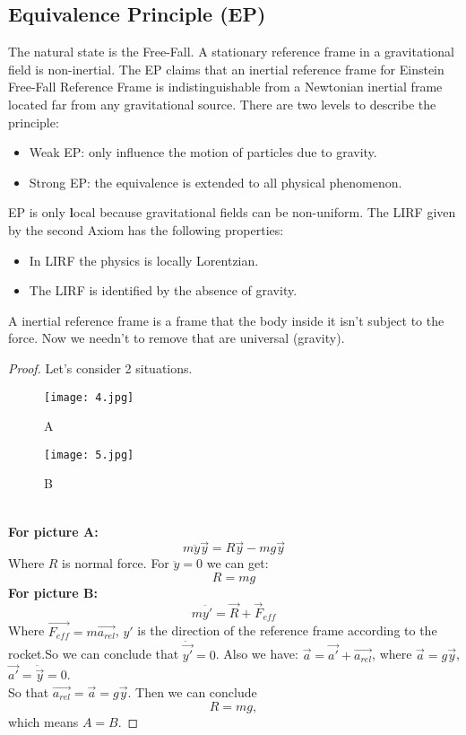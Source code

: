 \documentclass[openany,10pt]{book}
\theoremstyle{definition}
\theoremstyle{definition}
\theoremstyle{remark}
\begin{document}
\subsection{Equivalence Principle (EP)}
The natural state is the Free-Fall. A stationary reference frame in a gravitational field is non-inertial.
The EP claims that an inertial reference frame for Einstein Free-Fall Reference Frame is indistinguishable from a Newtonian inertial frame located far from any gravitational source. There are two levels to describe the principle:
\begin{itemize}
\item Weak EP: only influence the motion of particles due to gravity.
\item Strong EP: the equivalence is extended to all physical phenomenon.
\end{itemize}
EP is only {\textbf local} because gravitational fields can be non-uniform.
The LIRF given by the second Axiom has the following properties:
\begin{itemize}
\item In LIRF the physics is locally Lorentzian.
\item The LIRF is identified by the absence of gravity.
\end{itemize}
A inertial reference frame is a frame that the body inside it isn't subject to the force. Now we needn't to remove that are universal (gravity).\\

\begin{proof}

Let's consider 2 situations.
\begin{figure}[htbp]
\begin{minipage}[t]{0.5\linewidth}
\centering
\texttt{[image: 4.jpg]}
\caption{A}
\label{fig:side:a}
\end{minipage}%
\begin{minipage}[t]{0.5\linewidth}
\centering
\texttt{[image: 5.jpg]}
\caption{B}
\label{fig:side:b}
\end{minipage}
\end{figure}\\

\textbf{For picture A:}
\begin{equation}
m\ddot{y}\vec{y}=R\vec{y}-mg\vec{y}
\end{equation}
Where $R$ is normal force. For $\ddot{y}=0$ we can get:
\begin{equation}
{R=mg}
\end{equation}
\textbf{For picture B:}
\begin{equation}
m\ddot{y'}=\vec{R}+\vec{F}_{eff}
\end{equation}
Where $\vec{F_{eff}}=m\vec{a_{rel}}$, $y'$ is the direction of the reference frame according to the rocket.So we can conclude that $\ddot{\vec{y'}}=0$. Also we have: $\vec{a}=\vec{a'}+\vec{a_{rel}}$, where $\vec{a}=g\vec{y}$, $\vec{a'}=\ddot{\vec{y}}=0$.\\
So that $\vec{a_{rel}}=\vec{a}=g\vec{y}$. Then we can conclude 
\begin{equation}
{R=mg},
\end{equation}
which means $A=B$.
\end{proof}
\end{document}

